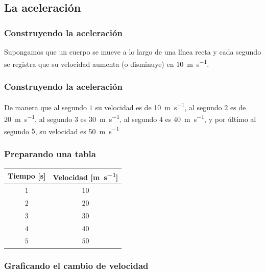 \documentclass[14pt]{beamer}
\begin{document}
\subsection{La aceleración}

\begin{frame}
\frametitle{Construyendo la aceleración}
Supongamos que un cuerpo se mueve a lo largo de una línea recta y cada segundo se registra que su velocidad aumenta (o disminuye) en \SI{10}{\meter\per\second}.
\end{frame}
\begin{frame}
\frametitle{Construyendo la aceleración}
De manera que al segundo $1$ su velocidad es de \SI{10}{\meter\per\second}, \pause al segundo $2$ es de \SI{20}{\meter\per\second}, \pause al segundo $3$ es \SI{30}{\meter\per\second}, \pause al segundo $4$ es \SI{40}{\meter\per\second}, \pause y por último al segundo $5$, su velocidad es \SI{50}{\meter\per\second}
\end{frame}
\begin{frame}
\frametitle{Preparando una tabla}
\begin{table}
\renewcommand{\arraystretch}{1}
\centering
\begin{tabular}{c | c}
Tiempo [\unit{\second}] & Velocidad [\unit{\meter\per\second}] \\ \hline
$1$ & $10$ \\ \hline
$2$ & $20$ \\ \hline
$3$ & $30$ \\ \hline
$4$ & $40$ \\ \hline
$5$ & $50$ \\ \hline
\end{tabular}
\end{table}
\end{frame}
\begin{frame}
\frametitle{Graficando el cambio de velocidad}
\vspace{-1cm}
\begin{figure}
    \centering
\end{figure}
\end{frame}
\end{document}
